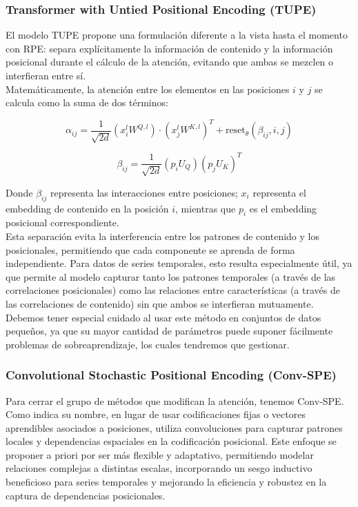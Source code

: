 \subsubsection{Transformer with Untied Positional Encoding (TUPE)}

El modelo TUPE propone una formulación diferente a la vista hasta el momento con RPE: separa explícitamente la información de contenido y la información posicional durante el cálculo de la atención, evitando que ambas se mezclen o interfieran entre sí.\\

Matemáticamente, la atención entre los elementos en las posiciones \(i\) y \(j\) se calcula como la suma de dos términos:

\begin{equation}
	\alpha_{ij} = \frac{1}{\sqrt{2d}} (x_i^l W^{Q,l})\cdot(x_j^l W^{K,l})^T + \mathrm{reset}_\theta(\beta_{ij}, i, j)
\end{equation}

\begin{equation}
	\beta_{ij} = \frac{1}{\sqrt{2d}} (p_i U_Q)(p_j U_K)^T
\end{equation}

Donde $\beta_{ij}$ representa las interacciones entre posiciones; \(x_i\) representa el embedding de contenido en la posición \(i\), mientras que \(p_i\) es el embedding posicional correspondiente.\\

Esta separación evita la interferencia entre los patrones de contenido y los posicionales, permitiendo que cada componente se aprenda de forma independiente. Para datos de series temporales, esto resulta especialmente útil, ya que permite al modelo capturar tanto los patrones temporales (a través de las correlaciones posicionales) como las relaciones entre características (a través de las correlaciones de contenido) sin que ambos se interfieran mutuamente.\\

Debemos tener especial cuidado al usar este método en conjuntos de datos pequeños, ya que su mayor cantidad de parámetros puede suponer fácilmente problemas de sobreaprendizaje, los cuales tendremos que gestionar.


\subsubsection{Convolutional Stochastic Positional Encoding (Conv-SPE)}

Para cerrar el grupo de métodos que modifican la atención, tenemos Conv-SPE. Como indica su nombre, en lugar de usar codificaciones fijas o vectores aprendibles asociados a posiciones, utiliza convoluciones para capturar patrones locales y dependencias espaciales en la codificación posicional. Este enfoque se proponer a priori por ser más flexible y adaptativo, permitiendo modelar relaciones complejas a distintas escalas, incorporando un sesgo inductivo beneficioso para series temporales y mejorando la eficiencia y robustez en la captura de dependencias posicionales. \\

